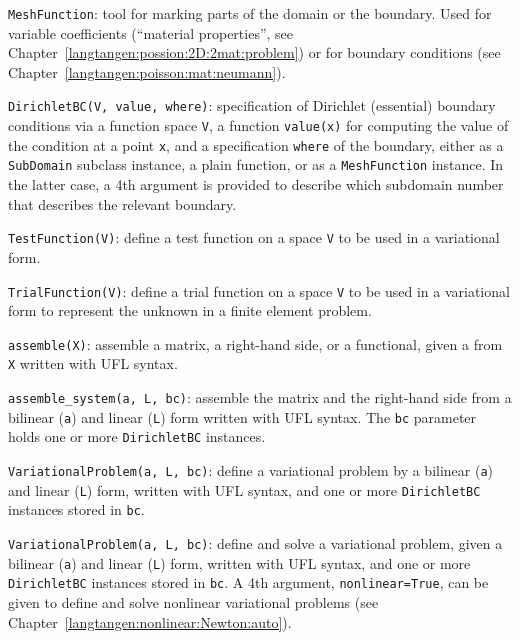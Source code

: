 {\fontsize{12pt}{12pt}\texttt{MeshFunction}}: tool for marking parts of the domain or the boundary.
Used for variable coefficients (``material properties'', see
Chapter~\ref{langtangen:possion:2D:2mat:problem}) or for
boundary conditions (see Chapter~\ref{langtangen:poisson:mat:neumann}).\gln

{\fontsize{12pt}{12pt}\texttt{DirichletBC(V, value, where)}}: specification of Dirichlet (essential)
boundary conditions via a function space {\fontsize{12pt}{12pt}\texttt{V}}, a function
{\fontsize{12pt}{12pt}\texttt{value(x)}} for computing the value of the condition at a point {\fontsize{12pt}{12pt}\texttt{x}},
and a specification {\fontsize{12pt}{12pt}\texttt{where}} of the boundary, either as a
{\fontsize{12pt}{12pt}\texttt{SubDomain}} subclass instance, a plain function, or as a
{\fontsize{12pt}{12pt}\texttt{MeshFunction}} instance.
In the latter case, a 4th argument is provided to describe which subdomain
number that describes the relevant boundary.\gln

{\fontsize{12pt}{12pt}\texttt{TestFunction(V)}}: define a test function on a space {\fontsize{12pt}{12pt}\texttt{V}} to be used
in a variational form.\gln

{\fontsize{12pt}{12pt}\texttt{TrialFunction(V)}}: define a trial function on a space {\fontsize{12pt}{12pt}\texttt{V}} to be used
in a variational form to represent the unknown in a finite element problem.\gln

{\fontsize{12pt}{12pt}\texttt{assemble(X)}}: assemble a matrix, a right-hand side, or a functional,
given a from {\fontsize{12pt}{12pt}\texttt{X}} written with UFL syntax.\gln

{\fontsize{12pt}{12pt}\verb!assemble_system(a, L, bc)!}: assemble the matrix and the right-hand
side from a bilinear ({\fontsize{12pt}{12pt}\texttt{a}}) and linear ({\fontsize{12pt}{12pt}\texttt{L}}) form written with UFL
syntax. The {\fontsize{12pt}{12pt}\texttt{bc}} parameter holds one or more {\fontsize{12pt}{12pt}\texttt{DirichletBC}} instances.\gln

{\fontsize{12pt}{12pt}\texttt{VariationalProblem(a, L, bc)}}: define a variational problem by
a bilinear ({\fontsize{12pt}{12pt}\texttt{a}}) and linear ({\fontsize{12pt}{12pt}\texttt{L}}) form, written with UFL
syntax, and one or more {\fontsize{12pt}{12pt}\texttt{DirichletBC}} instances stored in {\fontsize{12pt}{12pt}\texttt{bc}}.\gln

{\fontsize{12pt}{12pt}\texttt{VariationalProblem(a, L, bc)}}: define and solve a variational problem,
given a bilinear ({\fontsize{12pt}{12pt}\texttt{a}}) and linear ({\fontsize{12pt}{12pt}\texttt{L}}) form, written with UFL
syntax, and one or more {\fontsize{12pt}{12pt}\texttt{DirichletBC}} instances stored in {\fontsize{12pt}{12pt}\texttt{bc}}.
A 4th argument, {\fontsize{12pt}{12pt}\texttt{nonlinear=True}}, can be given to define and solve
nonlinear variational problems (see Chapter~\ref{langtangen:nonlinear:Newton:auto}).\gln

